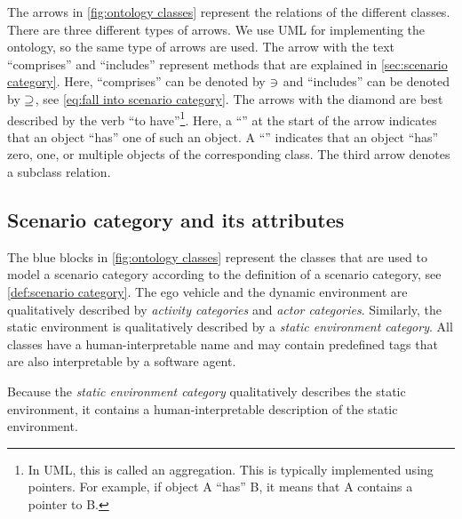 The arrows in \cref{fig:ontology classes} represent the relations of the different classes. 
There are three different types of arrows. 
We use UML for implementing the ontology, so the same type of arrows are used.
\cstart The arrow with the text ``comprises'' and ``includes'' represent methods that are explained in \cref{sec:scenario category}. Here, ``comprises'' can be denoted by $\ni$ and ``includes'' can be denoted by $\supseteq$, see \cref{eq:fall into scenario category}. \cend
The arrows with the diamond are best described by the verb ``to have''\footnote{In UML, this is called an aggregation.  This is typically implemented using pointers. For example, if object A ``has'' B, it means that A contains a pointer to B.}. \cstart Here, a ``\hasone'' at the start of the arrow indicates that an object ``has'' one of such an object. A ``\hasn'' indicates that an object ``has'' zero, one, or multiple objects of the corresponding class. \cend The third arrow denotes a subclass relation. 



\subsection{Scenario category and its attributes}
\label{sec:domain scenario category}

The blue blocks in \cref{fig:ontology classes} represent the classes that are used to model a scenario category according to the definition of a scenario category, see \cref{def:scenario category}. 
The ego vehicle and the dynamic environment are qualitatively described by \textit{activity categories} and \textit{actor categories}. Similarly, the static environment is qualitatively described by a \textit{static environment category}. \cstart All classes have a human-interpretable name and may contain predefined tags that are also interpretable by a software agent.\cend

Because the \textit{static environment category} qualitatively describes the static environment, it contains a human-interpretable description of the static environment.

